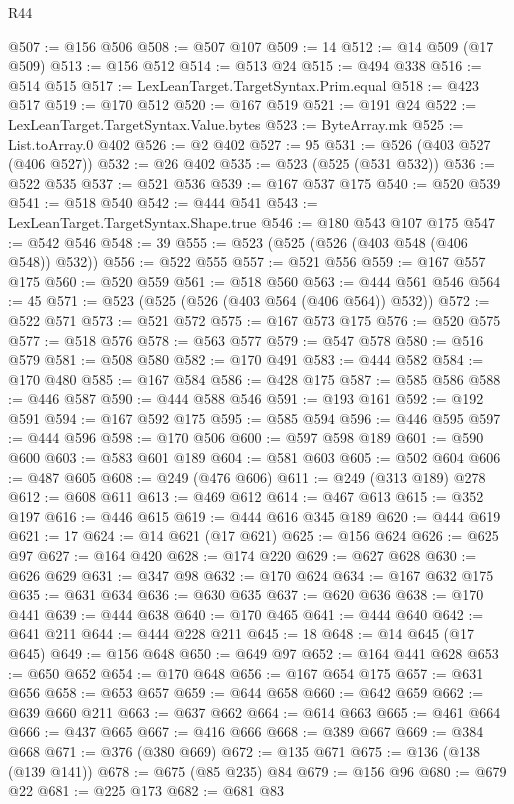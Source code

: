\begin{lexlean}{R44}
\begin{coremodule}
@507 := @156 @506
@508 := @507 @107
@509 := 14
@512 := @14 @509 (@17 @509)
@513 := @156 @512
@514 := @513 @24
@515 := @494 @338
@516 := @514 @515
@517 := LexLeanTarget.TargetSyntax.Prim.equal
@518 := @423 @517
@519 := @170 @512
@520 := @167 @519
@521 := @191 @24
@522 := LexLeanTarget.TargetSyntax.Value.bytes
@523 := ByteArray.mk
@525 := List.toArray.{0} @402
@526 := @2 @402
@527 := 95
@531 := @526 (@403 @527 (@406 @527))
@532 := @26 @402
@535 := @523 (@525 (@531 @532))
@536 := @522 @535
@537 := @521 @536
@539 := @167 @537 @175
@540 := @520 @539
@541 := @518 @540
@542 := @444 @541
@543 := LexLeanTarget.TargetSyntax.Shape.true
@546 := @180 @543 @107 @175
@547 := @542 @546
@548 := 39
@555 := @523 (@525 (@526 (@403 @548 (@406 @548)) @532))
@556 := @522 @555
@557 := @521 @556
@559 := @167 @557 @175
@560 := @520 @559
@561 := @518 @560
@563 := @444 @561 @546
@564 := 45
@571 := @523 (@525 (@526 (@403 @564 (@406 @564)) @532))
@572 := @522 @571
@573 := @521 @572
@575 := @167 @573 @175
@576 := @520 @575
@577 := @518 @576
@578 := @563 @577
@579 := @547 @578
@580 := @516 @579
@581 := @508 @580
@582 := @170 @491
@583 := @444 @582
@584 := @170 @480
@585 := @167 @584
@586 := @428 @175
@587 := @585 @586
@588 := @446 @587
@590 := @444 @588 @546
@591 := @193 @161
@592 := @192 @591
@594 := @167 @592 @175
@595 := @585 @594
@596 := @446 @595
@597 := @444 @596
@598 := @170 @506
@600 := @597 @598 @189
@601 := @590 @600
@603 := @583 @601 @189
@604 := @581 @603
@605 := @502 @604
@606 := @487 @605
@608 := @249 (@476 @606)
@611 := @249 (@313 @189) @278
@612 := @608 @611
@613 := @469 @612
@614 := @467 @613
@615 := @352 @197
@616 := @446 @615
@619 := @444 @616 @345 @189
@620 := @444 @619
@621 := 17
@624 := @14 @621 (@17 @621)
@625 := @156 @624
@626 := @625 @97
@627 := @164 @420
@628 := @174 @220
@629 := @627 @628
@630 := @626 @629
@631 := @347 @98
@632 := @170 @624
@634 := @167 @632 @175
@635 := @631 @634
@636 := @630 @635
@637 := @620 @636
@638 := @170 @441
@639 := @444 @638
@640 := @170 @465
@641 := @444 @640
@642 := @641 @211
@644 := @444 @228 @211
@645 := 18
@648 := @14 @645 (@17 @645)
@649 := @156 @648
@650 := @649 @97
@652 := @164 @441 @628
@653 := @650 @652
@654 := @170 @648
@656 := @167 @654 @175
@657 := @631 @656
@658 := @653 @657
@659 := @644 @658
@660 := @642 @659
@662 := @639 @660 @211
@663 := @637 @662
@664 := @614 @663
@665 := @461 @664
@666 := @437 @665
@667 := @416 @666
@668 := @389 @667
@669 := @384 @668
@671 := @376 (@380 @669)
@672 := @135 @671
@675 := @136 (@138 (@139 @141))
@678 := @675 (@85 @235) @84
@679 := @156 @96
@680 := @679 @22
@681 := @225 @173
@682 := @681 @83

\end{coremodule}
\end{lexlean}
